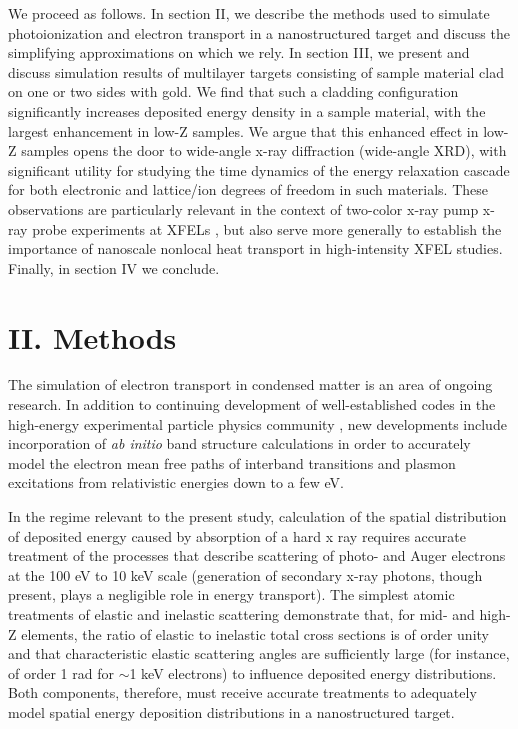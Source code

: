 We proceed as follows. In section II, we describe the methods used to
simulate photoionization and electron transport in a nanostructured
target and discuss the simplifying approximations on which we rely. In
section III, we present and discuss simulation results of multilayer
targets consisting of sample material clad on one or two sides with
gold. We find that such a cladding configuration significantly increases
deposited energy density in a sample material, with the largest
enhancement in low-Z samples. We argue that this enhanced effect in
low-Z samples opens the door to wide-angle x-ray diffraction (wide-angle
XRD), with significant utility for studying the time dynamics of the
energy relaxation cascade for both electronic and lattice/ion degrees of
freedom in such materials. These observations are particularly relevant
in the context of two-color x-ray pump x-ray probe experiments at
XFELs \cite{hoidn2017nonlocal, inoue2016observation, ho2015resonance, allaria2013two}, but also serve more generally to establish the
importance of nanoscale nonlocal heat transport in high-intensity XFEL
studies. Finally, in section IV we conclude.

\section{II. Methods}

The simulation of electron transport in condensed matter is an area of
ongoing research. In addition to continuing development of
well-established codes in the high-energy experimental particle physics
community \cite{agostinelli2003geant4}, new developments include incorporation of
\emph{ab initio} band structure calculations in order to accurately
model the electron mean free paths of interband transitions and plasmon
excitations from relativistic energies down to a few eV. \cite{gao2013monte, prange2014radiation}

In the regime relevant to the present study, calculation of the spatial
distribution of deposited energy caused by absorption of a hard x ray
requires accurate treatment of the processes that describe scattering of
photo- and Auger electrons at the 100 eV to 10 keV scale (generation of
secondary x-ray photons, though present, plays a negligible role in
energy transport). The simplest atomic treatments of elastic and
inelastic scattering demonstrate that, for mid- and high-Z elements, the
ratio of elastic to inelastic total cross sections is of order unity and
that characteristic elastic scattering angles are sufficiently large
(for instance, of order 1 rad for $\sim$1 keV electrons) to
influence deposited energy distributions. \cite{pollock2017accuracy} Both components,
therefore, must receive accurate treatments to adequately model spatial
energy deposition distributions in a nanostructured target.


